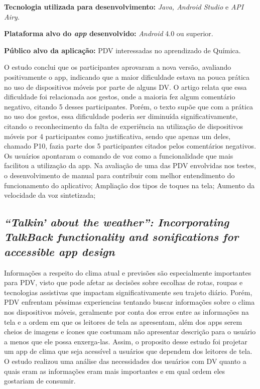 \textbf{Tecnologia utilizada para desenvolvimento:} \emph{Java, Android Studio} e \emph{API Airy}.

\textbf{Plataforma alvo do \emph{app} desenvolvido:} \emph{Android} 4.0 ou superior.

\textbf{Público alvo da aplicação:} PDV interessadas no aprendizado de Química\@.

O estudo conclui que os participantes aprovaram a nova versão, avaliando positivamente o app, indicando que a maior dificuldade estava na pouca prática no uso de dispositivos móveis por parte de alguns DV.
O artigo relata que essa dificuldade foi relacionada aos gestos, onde a maioria fez algum comentário negativo, citando 5 desses participantes.
Porém, o texto supõe que com a prática no uso dos gestos, essa dificuldade poderia ser diminuída significativamente, citando o reconhecimento da falta de experiência na utilização de dispositivos móveis por 4 participantes como justificativa, sendo que apenas um deles, chamado P10, fazia parte dos 5 participantes citados pelos comentários negativos.
Os usuários apontaram o comando de voz como a funcionalidade que mais facilitou a utilização da app.
Na avaliação de uma das PDV envolvidas nos testes, o desenvolvimento de manual para contribuir com melhor entendimento do funcionamento do aplicativo;
Ampliação dos tipos de toques na tela;
Aumento da velocidade da voz sintetizada;

\subsection{\emph{``Talkin' about the weather'': Incorporating TalkBack functionality and sonifications for accessible app design}}

Informações a respeito do clima atual e previsões são especialmente importantes para PDV, visto que pode afetar as decisões sobre escolhas de rotas, roupas e tecnologias assistivas que impactam significativamente seu trajeto diário.
Porém, PDV enfrentam péssimas experiencias tentando buscar informações sobre o clima nos dispositivos móveis, geralmente por conta dos erros entre as informações na tela e a ordem em que os leitores de tela as apresentam, além dos apps serem cheios de imagens e ícones que costumam não apresentar descrição para o usuário a menos que ele possa enxerga-las.
Assim, o proposito desse estudo foi projetar um app de clima que seja acessível a usuários que dependem dos leitores de tela.
O estudo realizou uma análise das necessidades dos usuários com DV quanto a quais eram as informações eram mais importantes e em qual ordem eles gostariam de consumir.

